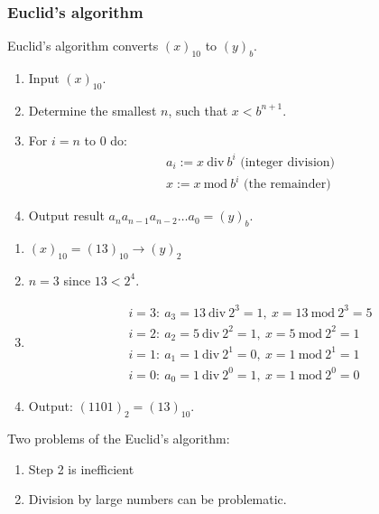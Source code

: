 \subsubsection{Euclid's algorithm}
Euclid's algorithm converts $(x)_{10}$ to $(y)_b$.
\begin{enumerate}%
    \item {
        Input $(x)_{10}$.
    }
    \item {
        Determine the smallest $n$, such that $x < b^{n+1}$.
    }
    \item {
        For $i=n$ to $0$ do:
        \begin{align*}
            &
            a_i := x\ \mathrm{div}\ b^{i} \text{ (integer division)}
            \\&
            x := x\ \mathrm{mod}\ b^{i} \text{ (the remainder)}
        \end{align*}
    }
    \item {
        Output result $a_n a_{n-1} a_{n-2} \dots a_0 = (y)_b$.
    }
\end{enumerate}

\begin{example}
    \begin{enumerate}
        \item {
            $(x)_{10} = (13)_{10} \to (y)_2$
        }
        \item {
            $n = 3$ since $13 < 2^4$.
        }
        \item {
            \begin{align*}
                &
                i = 3:\ a_3 = 13 \ \mathrm{div}\ 2^3 = 1,\
                x = 13 \ \mathrm{mod}\ 2^3 = 5
                \\&
                i = 2:\ a_2 = 5 \ \mathrm{div}\ 2^2 = 1,\
                x = 5 \ \mathrm{mod}\ 2^2 = 1
                \\&
                i = 1:\ a_1 = 1 \ \mathrm{div}\ 2^1 = 0,\
                x = 1 \ \mathrm{mod}\ 2^1 = 1
                \\&
                i = 0:\ a_0 = 1 \ \mathrm{div}\ 2^0 = 1,\
                x = 1 \ \mathrm{mod}\ 2^0 = 0
            \end{align*}
        }
        \item {
             Output: $(1101)_2 = (13)_{10}$.
        }
    \end{enumerate}
\end{example}
Two problems of the Euclid's algorithm:
\begin{enumerate}
    \item {
        Step 2 is inefficient
    }
    \item {
        Division by large numbers can be problematic.
    }
\end{enumerate}

